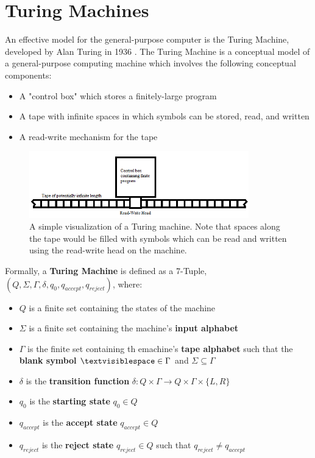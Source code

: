 \documentclass{article}
\begin{document}
\section{Turing Machines}
An effective model for the general-purpose computer is the Turing Machine, developed by Alan Turing in 1936 \cite{2}.  The Turing Machine is a conceptual model of a general-purpose computing machine which involves the following conceptual components:
\begin{itemize}
	\item A "control box" which stores a finitely-large program
	\item A tape with infinite spaces in which symbols can be stored, read, and written
	\item A read-write mechanism for the tape \cite{3}
\end{itemize}
\begin{figure}[h]
	\includegraphics[width=0.85\textwidth]{figure-3-1}
	\centering
	\caption{A simple visualization of a Turing machine.  Note that spaces along the tape would be filled with symbols which can be read and written using the read-write head on the machine.}
\end{figure}
\noindent Formally, a \textbf{Turing Machine} is defined as a 7-Tuple, $(Q, \Sigma, \Gamma, \delta, q_{0}, q_{accept}, q_{reject})$, where:
\begin{itemize}
	\item $Q$ is a finite set containing the states of the machine
	\item $\Sigma$ is a finite set containing the machine's \textbf{input alphabet}
	\item $\Gamma$ is the finite set containing th emachine's \textbf{tape alphabet} such that the \textbf{blank symbol} $\textvisiblespace \in \Gamma$ and $\Sigma \subseteq \Gamma$
	\item $\delta$ is the \textbf{transition function} $\delta: Q \times \Gamma \to Q \times \Gamma \times \{L, R\}$
	\item $q_{0}$ is the \textbf{starting state} $q_{0} \in Q$
	\item $q_{accept}$ is the \textbf{accept state} $q_{accept} \in Q$
	\item $q_{reject}$ is the \textbf{reject state} $q_{reject} \in Q$ such that $q_{reject} \neq q_{accept}$
\end{itemize}
\end{document}
